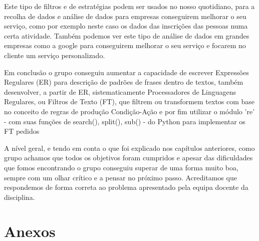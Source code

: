 \documentclass[11pt,a4paper]{report}
\begin{document}
    Este tipo de filtros e de estratégias podem ser usados no nosso quotidiano, para a recolha de dados e análise de dados para empresas conseguirem melhorar o seu serviço, como por exemplo neste caso os dados das inscrições das pessoas numa certa atividade. Também podemos ver este tipo de análise de dados em grandes empresas como a google para conseguirem melhorar o seu serviço e focarem no cliente um serviço personalizado. 
    
    Em conclusão o grupo conseguiu    aumentar a capacidade de escrever Expressões Regulares (ER) para descrição de padrões de frases dentro de textos, também desenvolver, a partir de ER, sistematicamente Processadores de Linguagens Regulares, ou Filtros de Texto (FT), que filtrem ou transformem textos com base no conceito de regras de produção Condição-Ação e por fim utilizar o módulo 're' - com suas funções de search(), split(), sub() - do Python para implementar os FT pedidos

    A nível geral, e tendo em conta o que foi explicado nos capítulos anteriores, como grupo achamos que todos os objetivos foram cumpridos e apesar das dificuldades que fomos encontrando o grupo conseguiu superar de uma forma muito boa, sempre com um olhar crítico e a pensar no próximo passo. Acreditamos que respondemos de forma correta ao problema apresentado pela equipa docente da disciplina.
	
\pagebreak

    \chapter{Anexos}
\end{document}
